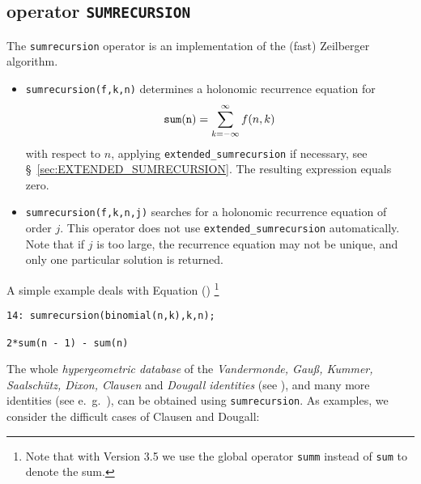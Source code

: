 \subsection{\REDUCE{} operator {\tt SUMRECURSION}}

The {\tt sumrecursion} operator is an implementation of the (fast)
Zeilberger algorithm.
\begin{itemize}
\item
{\tt sumrecursion(f,k,n)} determines a holonomic recurrence equation
for
\[
{\tt sum(n)} =\sum\limits_{k=-\infty}^\infty f(n,k)
\]
with respect to $n$, applying
{\tt extended\_sumrecursion} if necessary,
see \S~\ref{sec:EXTENDED_SUMRECURSION}.
The resulting expression equals zero.
\item
{\tt sumrecursion(f,k,n,j)} %
searches for a holonomic recurrence equation of order $j$. This
operator does not use {\tt extended\_sumrecursion} automatically.
Note that if $j$ is too large, the recurrence equation
may not be unique, and only one particular solution is returned.
\end{itemize}
A simple example deals with Equation ()%
\footnote{Note that with \REDUCE{} Version 3.5 we use the global operator
{\tt summ} instead of {\tt sum} to denote the sum.}

{\small
\begin{verbatim}
14: sumrecursion(binomial(n,k),k,n);

2*sum(n - 1) - sum(n)
\end{verbatim}
}\noindent
The whole \textsl{hypergeometric database} of the {\sl
Vandermonde, Gau{\ss}, Kummer, Saalsch\"utz, Dixon, Clausen} and \textsl{Dougall
identities} (see \cite{Wilf:93}), and many more identities (see e.\ g.\
\cite{Koepf:94b}), can be obtained using {\tt sumrecursion}.
As examples, we consider the difficult cases of Clausen and Dougall:%

